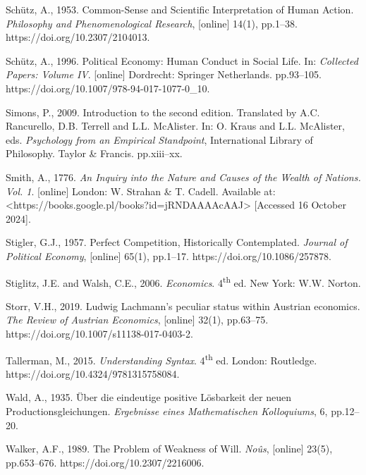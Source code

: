 Schütz, A., 1953. Common-Sense and Scientific Interpretation of Human Action. \textit{Philosophy and Phenomenological Research}, [online] 14(1), pp.1–38. https://doi.org/10.2307/2104013.



Schütz, A., 1996. Political Economy: Human Conduct in Social Life. In: \textit{Collected Papers: Volume IV}. [online] Dordrecht: Springer Netherlands. pp.93–105. https://doi.org/10.1007/978-94-017-1077-0\_10.



Simons, P., 2009. Introduction to the second edition. Translated by A.C. Rancurello, D.B. Terrell and L.L. McAlister. In: O. Kraus and L.L. McAlister, eds. \textit{Psychology from an Empirical Standpoint}, International Library of Philosophy. Taylor \& Francis. pp.xiii–xx.



Smith, A., 1776. \textit{An Inquiry into the Nature and Causes of the Wealth of Nations. Vol. 1}. [online] London: W. Strahan \& T. Cadell. Available at: {\textless}https://books.google.pl/books?id=jRNDAAAAcAAJ{\textgreater} [Accessed 16 October 2024].



Stigler, G.J., 1957. Perfect Competition, Historically Contemplated. \textit{Journal of Political Economy}, [online] 65(1), pp.1–17. https://doi.org/10.1086/257878.



Stiglitz, J.E. and Walsh, C.E., 2006. \textit{Economics}. 4\textsuperscript{th} ed. New York: W.W. Norton.



Storr, V.H., 2019. Ludwig Lachmann's peculiar status within Austrian economics. \textit{The Review of Austrian Economics}, [online] 32(1), pp.63–75. https://doi.org/10.1007/s11138-017-0403-2.



Tallerman, M., 2015. \textit{Understanding Syntax}. 4\textsuperscript{th} ed. London: Routledge. https://doi.org/10.4324/9781315758084.



Wald, A., 1935. Über die eindeutige positive Lösbarkeit der neuen Productionsgleichungen. \textit{Ergebnisse eines Mathematischen Kolloquiums}, 6, pp.12–20.



Walker, A.F., 1989. The Problem of Weakness of Will. \textit{Noûs}, [online] 23(5), pp.653–676. https://doi.org/10.2307/2216006.



